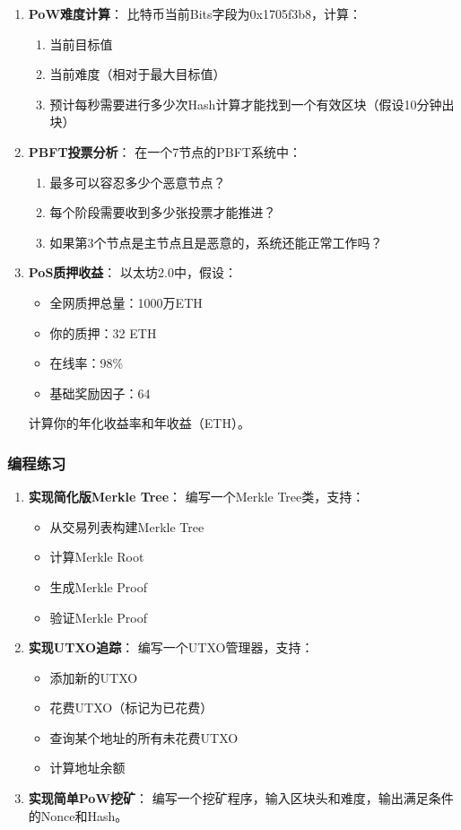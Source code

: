 ﻿\documentclass[12pt,a4paper]{article}
\begin{document}
\begin{enumerate}[leftmargin=1.5em]
\item \textbf{PoW难度计算}：
比特币当前Bits字段为0x1705f3b8，计算：
\begin{enumerate}
\item 当前目标值
\item 当前难度（相对于最大目标值）
\item 预计每秒需要进行多少次Hash计算才能找到一个有效区块（假设10分钟出块）
\end{enumerate}

\item \textbf{PBFT投票分析}：
在一个7节点的PBFT系统中：
\begin{enumerate}
\item 最多可以容忍多少个恶意节点？
\item 每个阶段需要收到多少张投票才能推进？
\item 如果第3个节点是主节点且是恶意的，系统还能正常工作吗？
\end{enumerate}

\item \textbf{PoS质押收益}：
以太坊2.0中，假设：
\begin{itemize}[leftmargin=1.5em]
\item 全网质押总量：1000万ETH
\item 你的质押：32 ETH
\item 在线率：98\%
\item 基础奖励因子：64
\end{itemize}
计算你的年化收益率和年收益（ETH）。
\end{enumerate}

\subsubsection{编程练习}

\begin{enumerate}[leftmargin=1.5em]
\item \textbf{实现简化版Merkle Tree}：
编写一个Merkle Tree类，支持：
\begin{itemize}[leftmargin=1.5em]
\item 从交易列表构建Merkle Tree
\item 计算Merkle Root
\item 生成Merkle Proof
\item 验证Merkle Proof
\end{itemize}

\item \textbf{实现UTXO追踪}：
编写一个UTXO管理器，支持：
\begin{itemize}[leftmargin=1.5em]
\item 添加新的UTXO
\item 花费UTXO（标记为已花费）
\item 查询某个地址的所有未花费UTXO
\item 计算地址余额
\end{itemize}

\item \textbf{实现简单PoW挖矿}：
编写一个挖矿程序，输入区块头和难度，输出满足条件的Nonce和Hash。
\end{enumerate}
\end{document}
